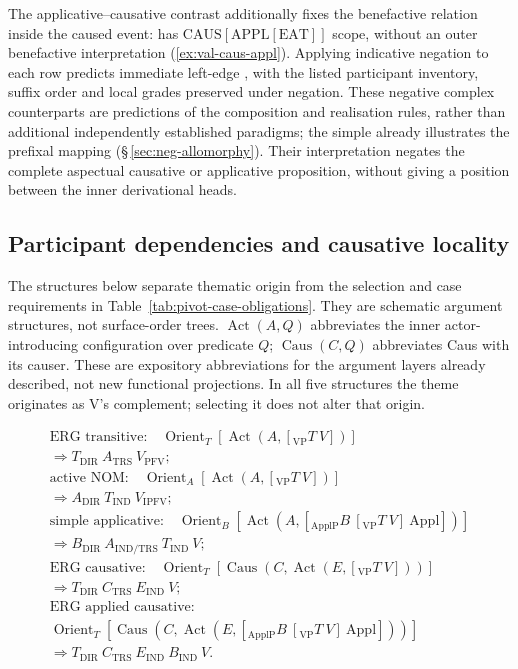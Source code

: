 \noindent The applicative--causative contrast additionally fixes the
benefactive relation inside the caused event:  has
$\mathrm{CAUS}[\mathrm{APPL}[\mathrm{EAT}]]$ scope, without an outer
benefactive interpretation (\ref{ex:val-caus-appl}). Applying indicative
negation to each row predicts immediate left-edge , with the listed
participant inventory, suffix order and local grades preserved under negation.
These negative complex counterparts are predictions of the composition and
realisation rules, rather than additional independently established paradigms;
the simple  already illustrates the prefixal mapping
(§\,\ref{sec:neg-allomorphy}). Their interpretation negates the complete
aspectual causative or applicative proposition, without giving  a
position between the inner derivational heads.

\subsection{Participant dependencies and causative locality}
\label{sec:vm-pivot-derivations}

The structures below separate thematic origin from the selection and case
requirements in Table~\ref{tab:pivot-case-obligations}. They are schematic
argument structures, not surface-order trees. $\operatorname{Act}(A,Q)$
abbreviates the inner actor-introducing configuration over predicate $Q$;
$\operatorname{Caus}(C,Q)$ abbreviates Caus with its causer. These are
expository abbreviations for the argument layers already described, not new
functional projections. In all five structures the theme originates as V's
complement; selecting it does not alter that origin.

\begin{gather*}
\text{ERG transitive:}\quad
 \operatorname{Orient}_{T}[\operatorname{Act}(A,[_{\mathrm{VP}}T\ V])]
 \\ \Rightarrow T_{\mathrm{DIR}}\ A_{\mathrm{TRS}}\ V_{\mathrm{PFV}};\\[3pt]
\text{active NOM:}\quad
 \operatorname{Orient}_{A}[\operatorname{Act}(A,[_{\mathrm{VP}}T\ V])]
 \\ \Rightarrow A_{\mathrm{DIR}}\ T_{\mathrm{IND}}\ V_{\mathrm{IPFV}};\\[3pt]
\text{simple applicative:}\quad
 \operatorname{Orient}_{B}[\operatorname{Act}(A,[_{\mathrm{ApplP}}B\ [_{\mathrm{VP}}T\ V]\ \mathrm{Appl}])]
 \\ \Rightarrow B_{\mathrm{DIR}}\ A_{\mathrm{IND/TRS}}\ T_{\mathrm{IND}}\ V;\\[3pt]
\text{ERG causative:}\quad
 \operatorname{Orient}_{T}[\operatorname{Caus}(C,\operatorname{Act}(E,[_{\mathrm{VP}}T\ V]))]
 \\ \Rightarrow T_{\mathrm{DIR}}\ C_{\mathrm{TRS}}\ E_{\mathrm{IND}}\ V;\\[3pt]
\text{ERG applied causative:}\\
 \operatorname{Orient}_{T}[\operatorname{Caus}(C,\operatorname{Act}(E,[_{\mathrm{ApplP}}B\ [_{\mathrm{VP}}T\ V]\ \mathrm{Appl}]))]
 \\ \Rightarrow T_{\mathrm{DIR}}\ C_{\mathrm{TRS}}\ E_{\mathrm{IND}}\ B_{\mathrm{IND}}\ V.
\end{gather*}

